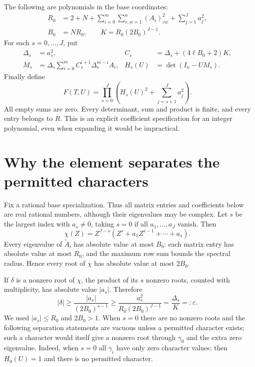 \documentclass[11pt]{article}
\begin{document}
The following are polynomials in the base coordinates:
\begin{align}
 R_0&=2+N+\sum_{i=0}^{m}\sum_{v,w=1}^{n}(A_i)_{vw}^2
                         +\sum_{j=1}^{J}a_j^2,\label{Rbound}\\
 B_0&=NR_0,\qquad K=R_0(2B_0)^{J-1}.\label{Kbound}
\end{align}
For each $s=0,\ldots,J$, put
\begin{align}
 \Delta_s&=a_s^2,& C_s&=\Delta_s+(4\ell B_0+2)K,\label{Cs}\\
 M_s&=\Delta_s\sum_{i=0}^{m}
                   C_s^{i+1}\Delta_s^{m-i}A_i,&
 H_s(U)&=\det(I_n-UM_s).\label{Ms}
\end{align}
Finally define
\begin{equation}\label{Fformula}
 \boxed{\displaystyle
 F(T,U)=\prod_{s=0}^{J}
       \left(H_s(U)^2+\sum_{j=s+1}^{J}a_j^2\right).}
\end{equation}
All empty sums are zero. Every determinant, sum and product is finite,
and every entry belongs to $R$. This is an explicit coefficient
specification for an integer polynomial, even when expanding it would
be impractical.

\section{Why the element separates the permitted characters}
Fix a rational base specialization. Thus all matrix entries and coefficients
below are real rational numbers, although their eigenvalues may be complex.
Let $s$ be the largest index with $a_s\ne0$, taking $s=0$ if all
$a_1,\ldots,a_J$ vanish. Then
\[
 \chi(Z)=Z^{J-s}(Z^s+a_1Z^{s-1}+\cdots+a_s).
\]
Every eigenvalue of $\widetilde A_i$ has absolute value at most $B_0$:
each matrix entry has absolute value at most $R_0$, and the maximum row
sum bounds the spectral radius. Hence every root of $\chi$ has absolute
value at most $2B_0$.

If $\delta$ is a nonzero root of $\chi$, the product of its $s$ nonzero
roots, counted with multiplicity, has absolute value $|a_s|$. Therefore
\begin{equation}\label{lowerseparation}
 |\delta|\ge\frac{|a_s|}{(2B_0)^{s-1}}
       \ge\frac{a_s^2}{R_0(2B_0)^{J-1}}
       =\frac{\Delta_s}{K}=:\varepsilon.
\end{equation}
We used $|a_s|\le R_0$ and $2B_0>1$. When $s=0$ there are no nonzero
roots and the following separation statements are vacuous unless a
permitted character exists; such a character would itself give a
nonzero root through $\gamma_0$ and the extra zero eigenvalue. Indeed,
when $s=0$ all $\gamma_i$ have only zero character values; then
$H_0(U)=1$ and there is no permitted character.
\end{document}

